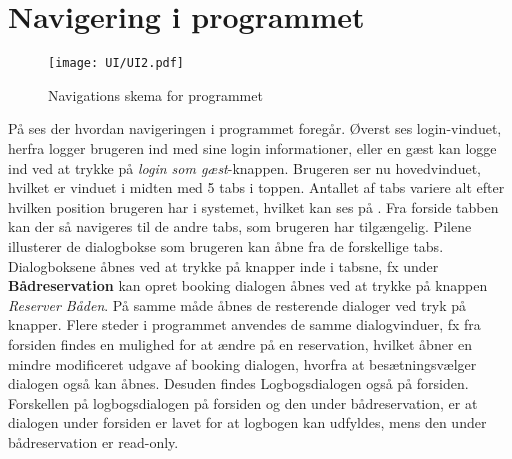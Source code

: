 \section{Navigering i programmet}
\begin{figure}[H]
\texttt{[image: UI/UI2.pdf]}
\label{img:programNavigation}
\vspace{-310pt}
\caption{Navigations skema for programmet}
\vspace{-20pt}
\end{figure}
På  ses der hvordan navigeringen i programmet foregår.
Øverst ses login-vinduet, herfra logger brugeren ind med sine login informationer, eller en gæst kan logge ind ved at trykke på \textit{login som gæst}-knappen.
Brugeren ser nu hovedvinduet, hvilket er vinduet i midten med 5 tabs i toppen.
Antallet af tabs variere alt efter hvilken position brugeren har i systemet, hvilket kan ses på . 
Fra forside tabben kan der så navigeres til de andre tabs, som brugeren har tilgængelig.
Pilene illusterer de dialogbokse som brugeren kan åbne fra de forskellige tabs.
Dialogboksene åbnes ved at trykke på knapper inde i tabsne, fx under  \textbf{Bådreservation} kan opret booking dialogen åbnes ved at trykke på knappen \textit{Reserver Båden}. 
På samme måde åbnes de resterende dialoger ved tryk på knapper.
Flere steder i programmet anvendes de samme dialogvinduer, fx fra forsiden findes en mulighed for at ændre på en reservation, hvilket åbner en mindre modificeret udgave af booking dialogen, hvorfra at besætningsvælger dialogen også kan åbnes.
Desuden findes Logbogsdialogen også på forsiden.
Forskellen på logbogsdialogen på forsiden og den under bådreservation, er at dialogen under forsiden er lavet for at logbogen kan udfyldes, mens den under bådreservation er read-only.
